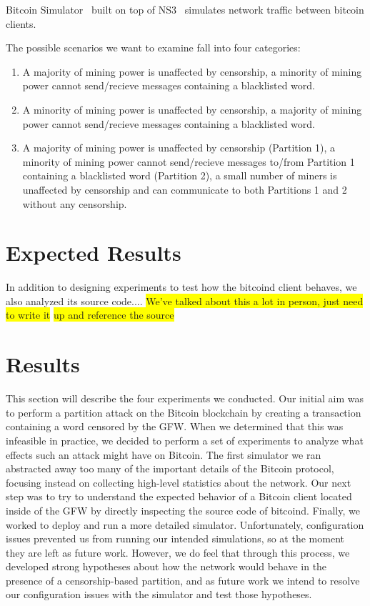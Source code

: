 Bitcoin Simulator~\cite{bitcoin-simulator} built on top of NS3~\cite{NS3} simulates network traffic between bitcoin clients. %

The possible scenarios we want to examine fall into four categories:
\begin{enumerate}
\item A majority of mining power is unaffected by censorship, a minority of mining power cannot send/recieve messages containing a blacklisted word.
\item A minority of mining power is unaffected by censorship, a majority of mining power cannot send/recieve messages containing a blacklisted word.
\item A majority of mining power is unaffected by censorship (Partition 1), a minority of mining power cannot send/recieve messages to/from Partition 1 containing a blacklisted word (Partition 2), a small number of miners is unaffected by censorship and can communicate to both Partitions 1 and 2 without any censorship.
\end{enumerate}

\section{Expected Results}
In addition to designing experiments to test how the bitcoind client behaves, we also analyzed its source code....
\colorbox{yellow}{We've talked about this a lot in person, just need to write it} \colorbox{yellow}{up and reference the source}

\section{Results}
This section will describe the four experiments we conducted. Our initial aim was to perform a partition attack on the Bitcoin blockchain by creating a transaction containing a word censored by the GFW. When we determined that this was infeasible in practice, we decided to perform a set of experiments to analyze what effects such an attack might have on Bitcoin. The first simulator we ran abstracted away too many of the important details of the Bitcoin protocol, focusing instead on collecting high-level statistics about the network. Our next step was to try to understand the expected behavior of a Bitcoin client located inside of the GFW by directly inspecting the source code of bitcoind. Finally, we worked to deploy and run a more detailed simulator. Unfortunately, configuration issues prevented us from running our intended simulations, so at the moment they are left as future work. However, we do feel that through this process, we developed strong hypotheses about how the network would behave in the presence of a censorship-based partition, and as future work we intend to resolve our configuration issues with the simulator and test those hypotheses.

